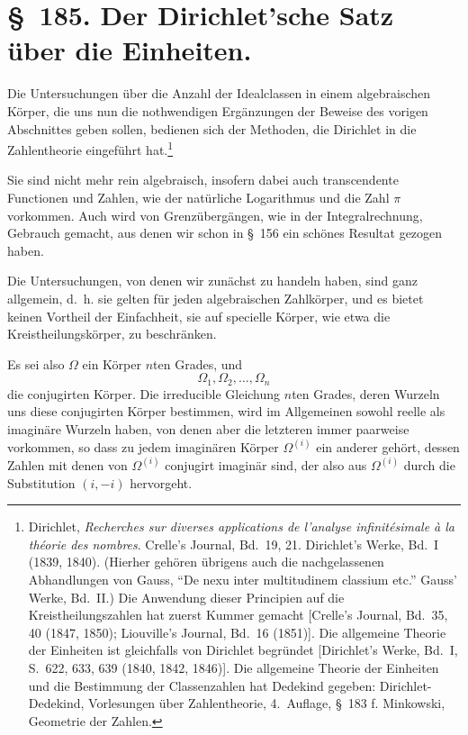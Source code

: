 \documentclass[11pt]{article}
\begin{document}
\section*{\S~185. Der Dirichlet'sche Satz über die Einheiten.}

Die Untersuchungen über die Anzahl der Idealclassen in einem algebraischen Körper, die uns nun die nothwendigen Ergänzungen der Beweise des vorigen Abschnittes geben sollen, bedienen sich der Methoden, die Dirichlet in die Zahlentheorie eingeführt hat.\footnote{Dirichlet, \textit{Recherches sur diverses applications de l'analyse infinitésimale à la théorie des nombres}. Crelle's Journal, Bd.~19, 21. Dirichlet's Werke, Bd.~I (1839, 1840). (Hierher gehören übrigens auch die nachgelassenen Abhandlungen von Gauss, ``De nexu inter multitudinem classium etc.'' Gauss' Werke, Bd.~II.) Die Anwendung dieser Principien auf die Kreistheilungszahlen hat zuerst Kummer gemacht [Crelle's Journal, Bd.~35, 40 (1847, 1850); Liouville's Journal, Bd.~16 (1851)]. Die allgemeine Theorie der Einheiten ist gleichfalls von Dirichlet begründet [Dirichlet's Werke, Bd.~I, S.~622, 633, 639 (1840, 1842, 1846)]. Die allgemeine Theorie der Einheiten und die Bestimmung der Classenzahlen hat Dedekind gegeben: Dirichlet-Dedekind, Vorlesungen über Zahlentheorie, 4.~Auflage, \S~183 f. Minkowski, Geometrie der Zahlen.}

Sie sind nicht mehr rein algebraisch, insofern dabei auch transcendente Functionen und Zahlen, wie der natürliche Logarithmus und die Zahl $\pi$ vorkommen. Auch wird von Grenzübergängen, wie in der Integralrechnung, Gebrauch gemacht, aus denen wir schon in \S~156 ein schönes Resultat gezogen haben.

Die Untersuchungen, von denen wir zunächst zu handeln haben, sind ganz allgemein, d.~h. sie gelten für jeden algebraischen Zahlkörper, und es bietet keinen Vortheil der Einfachheit, sie auf specielle Körper, wie etwa die Kreistheilungskörper, zu beschränken.

Es sei also $\Omega$ ein Körper $n$ten Grades, und
\begin{equation}
\Omega_1,\Omega_2,\ldots,\Omega_n
\tag{1}
\end{equation}
die conjugirten Körper. Die irreducible Gleichung $n$ten Grades, deren Wurzeln uns diese conjugirten Körper bestimmen, wird im Allgemeinen sowohl reelle als imaginäre Wurzeln haben, von denen aber die letzteren immer paarweise vorkommen, so dass zu jedem imaginären Körper $\Omega^{(i)}$ ein anderer gehört, dessen Zahlen mit denen von $\Omega^{(i)}$ conjugirt imaginär sind, der also aus $\Omega^{(i)}$ durch die Substitution $(i,-i)$ hervorgeht.
\end{document}
